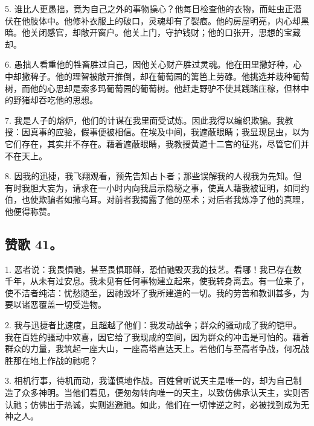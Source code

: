 5. 谁比人更愚拙，竟为自己之外的事物操心？他每日检查他的衣物，而蛀虫正潜伏在他肢体中。他修补衣服上的破口，灵魂却有了裂痕。他的房屋明亮，内心却黑暗。他关闭感官，却敞开窗户。他关上门，守护钱财；他的口张开，思想的宝藏却。\par

6. 愚拙人看重他的牲畜胜过自己，因他关心财产胜过灵魂。他在田里撒好种，心中却撒稗子。他的理智被敞开推倒，却在葡萄园的篱笆上劳碌。他挑选并栽种葡萄树，而他的心思却是索多玛葡萄园的葡萄树。他赶走野驴不使其践踏庄稼，但林中的野猪却吞吃他的思想。\par

7. 我是人子的熔炉，他们的计谋在我里面受试炼。因此我得以编织欺骗。我教授：因真事的应验，假事便被相信。在埃及中间，我遮蔽眼睛；我显现昆虫，以为它们存在，其实并不存在。藉着遮蔽眼睛，我教授黄道十二宫的征兆，尽管它们并不在天上。\par

8. 因我的迅捷，我飞翔观看，预先告知占卜者；那些误解我的人视我为先知。但有时我胆大妄为，请求在一小时内向我启示隐秘之事，使真人藉我被证明，如同约伯，也使欺骗者如撒乌耳。对前者我揭露了他的巫术；对后者我炼净了他的真理，他便得称赞。\par


\subsection{赞歌 41。}

1. 恶者说：我畏惧祂，甚至畏惧耶稣，恐怕祂毁灭我的技艺。看哪！我已存在数千年，从未有过安息。我未见有任何事物建立起来，使我转身离去。有一位来了，使不洁者纯洁：忧愁随至，因祂毁坏了我所建造的一切。我的劳苦和教训甚多，为要以诸恶覆盖一切受造物。\par

2. 我与迅捷者比速度，且超越了他们：我发动战争；群众的骚动成了我的铠甲。我在百姓的骚动中欢喜，因它给了我现成的空间，因为群众的冲击是可怕的。藉着群众的力量，我筑起一座大山，一座高塔直达天上。若他们与至高者争战，何况战胜那在地上作战的祂呢？\par

3. 相机行事，待机而动，我谨慎地作战。百姓曾听说天主是唯一的，却为自己制造了众多神明。当他们看见，便匆匆转向唯一的天主，以致仿佛承认天主，实则否认祂；仿佛出于热诚，实则逃避祂。如此，他们在一切悖逆之时，必被找到成为无神之人。\par

